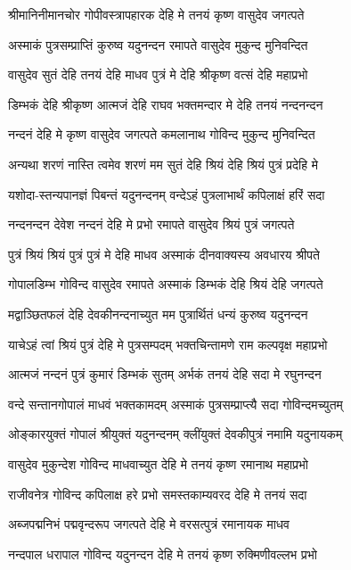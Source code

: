 \twolineshloka
{श्रीमानिनीमानचोर गोपीवस्त्रापहारक}
{देहि मे तनयं कृष्ण वासुदेव जगत्पते}%

\twolineshloka
{अस्माकं पुत्रसम्प्राप्तिं कुरुष्व यदुनन्दन}
{रमापते वासुदेव मुकुन्द मुनिवन्दित}%

\twolineshloka
{वासुदेव सुतं देहि तनयं देहि माधव}
{पुत्रं मे देहि श्रीकृष्ण वत्सं देहि महाप्रभो}%

\twolineshloka
{डिम्भकं देहि श्रीकृष्ण आत्मजं देहि राघव}
{भक्तमन्दार मे देहि तनयं नन्दनन्दन}%

\twolineshloka
{नन्दनं देहि मे कृष्ण वासुदेव जगत्पते}
{कमलानाथ गोविन्द मुकुन्द मुनिवन्दित}%

\twolineshloka
{अन्यथा शरणं नास्ति त्वमेव शरणं मम}
{सुतं देहि श्रियं देहि श्रियं पुत्रं प्रदेहि मे}%

\twolineshloka
{यशोदा-स्तन्यपानज्ञं पिबन्तं यदुनन्दनम्}
{वन्देऽहं पुत्रलाभार्थं कपिलाक्षं हरिं सदा}%

\twolineshloka
{नन्दनन्दन देवेश नन्दनं देहि मे प्रभो}
{रमापते वासुदेव श्रियं पुत्रं जगत्पते}%

\twolineshloka
{पुत्रं श्रियं श्रियं पुत्रं पुत्रं मे देहि माधव}
{अस्माकं दीनवाक्यस्य अवधारय श्रीपते}%

\twolineshloka
{गोपालडिम्भ गोविन्द वासुदेव रमापते}
{अस्माकं डिम्भकं देहि श्रियं देहि जगत्पते}%

\twolineshloka
{मद्वाञ्छितफलं देहि देवकीनन्दनाच्युत}
{मम पुत्रार्थितं धन्यं कुरुष्व यदुनन्दन}%

\twolineshloka
{याचेऽहं त्वां श्रियं पुत्रं देहि मे पुत्रसम्पदम्}
{भक्तचिन्तामणे राम कल्पवृक्ष महाप्रभो}%

\twolineshloka
{आत्मजं नन्दनं पुत्रं कुमारं डिम्भकं सुतम्}
{अर्भकं तनयं देहि सदा मे रघुनन्दन}%

\twolineshloka
{वन्दे सन्तानगोपालं माधवं भक्तकामदम्}
{अस्माकं पुत्रसम्प्राप्त्यै सदा गोविन्दमच्युतम्}%

\twolineshloka
{ओङ्कारयुक्तं गोपालं श्रीयुक्तं यदुनन्दनम्}
{क्लींयुक्तं देवकीपुत्रं नमामि यदुनायकम्}%

\twolineshloka
{वासुदेव मुकुन्देश गोविन्द माधवाच्युत}
{देहि मे तनयं कृष्ण रमानाथ महाप्रभो}%

\twolineshloka
{राजीवनेत्र गोविन्द कपिलाक्ष हरे प्रभो}
{समस्तकाम्यवरद देहि मे तनयं सदा}%

\twolineshloka
{अब्जपद्मनिभं पद्मवृन्दरूप जगत्पते}
{देहि मे वरसत्पुत्रं रमानायक माधव}%

\twolineshloka
{नन्दपाल धरापाल गोविन्द यदुनन्दन}
{देहि मे तनयं कृष्ण रुक्मिणीवल्लभ प्रभो}%


